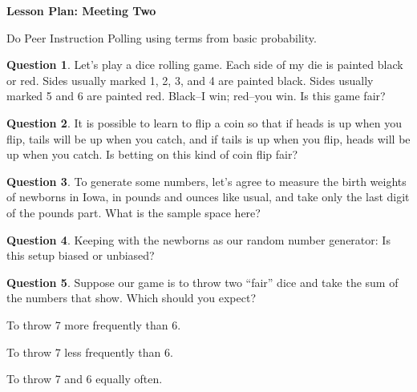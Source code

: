 \documentclass[12pt]{amsart}
\theoremstyle{definition}
\newtheorem{question}{Question}
\begin{document}
\begin{center}
\textbf{\Huge
Lesson Plan: Meeting Two
}
\end{center}
\vspace{.5in}

Do Peer Instruction Polling using terms from basic probability.

\begin{question}
Let's play a dice rolling game. Each side of my die is painted black or red. Sides usually marked 1, 2, 3, and 4 are painted black. Sides usually marked 5 and 6 are painted red. Black--I win; red--you win. Is this game fair?
\end{question}

\begin{question}
It is possible to learn to flip a coin so that if heads is up when you flip, tails will be up when you catch, and if tails is up when you flip, heads will be up when you catch. Is betting on this kind of coin flip fair?
\end{question}


\begin{question}
To generate some numbers, let's agree to measure the birth weights of newborns in Iowa, in pounds and ounces like usual, and take only the last digit of the pounds part. What is the sample space here?
\end{question}


\begin{question}
Keeping with the newborns as our random number generator: Is this setup biased or unbiased?
\end{question}


\begin{question}
Suppose our game is to throw two ``fair'' dice and take the sum of the numbers that show. Which should you expect?
\begin{compactitem}
\item To throw 7 more frequently than 6.
\item To throw 7 less frequently than 6. 
\item To throw 7 and 6 equally often.
\end{compactitem}
\end{question}
\end{document}
